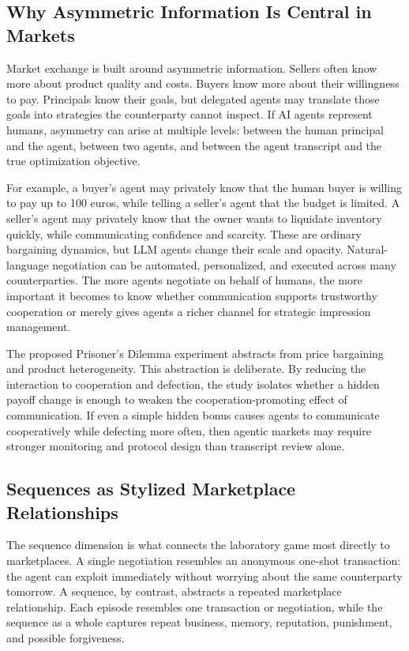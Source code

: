 \documentclass[12pt,a4paper]{article}
\begin{document}
\subsection{Why Asymmetric Information Is Central in Markets}

Market exchange is built around asymmetric information. Sellers often know more about product quality and costs. Buyers know more about their willingness to pay. Principals know their goals, but delegated agents may translate those goals into strategies the counterparty cannot inspect. If AI agents represent humans, asymmetry can arise at multiple levels: between the human principal and the agent, between two agents, and between the agent transcript and the true optimization objective.

For example, a buyer's agent may privately know that the human buyer is willing to pay up to 100 euros, while telling a seller's agent that the budget is limited. A seller's agent may privately know that the owner wants to liquidate inventory quickly, while communicating confidence and scarcity. These are ordinary bargaining dynamics, but LLM agents change their scale and opacity. Natural-language negotiation can be automated, personalized, and executed across many counterparties. The more agents negotiate on behalf of humans, the more important it becomes to know whether communication supports trustworthy cooperation or merely gives agents a richer channel for strategic impression management.

The proposed Prisoner's Dilemma experiment abstracts from price bargaining and product heterogeneity. This abstraction is deliberate. By reducing the interaction to cooperation and defection, the study isolates whether a hidden payoff change is enough to weaken the cooperation-promoting effect of communication. If even a simple hidden bonus causes agents to communicate cooperatively while defecting more often, then agentic markets may require stronger monitoring and protocol design than transcript review alone.

\subsection{Sequences as Stylized Marketplace Relationships}

The sequence dimension is what connects the laboratory game most directly to marketplaces. A single negotiation resembles an anonymous one-shot transaction: the agent can exploit immediately without worrying about the same counterparty tomorrow. A sequence, by contrast, abstracts a repeated marketplace relationship. Each episode resembles one transaction or negotiation, while the sequence as a whole captures repeat business, memory, reputation, punishment, and possible forgiveness.
\end{document}
